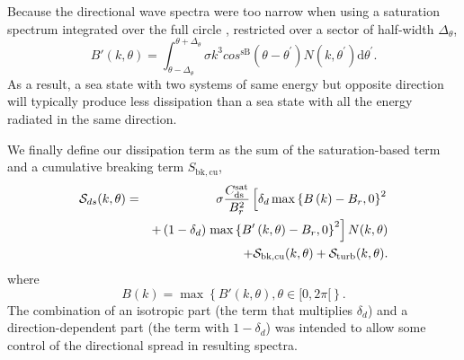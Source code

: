 Because the directional wave spectra were too narrow when using a
saturation spectrum integrated over the full circle \citep{art:AL06},
\citet{art:Aea10} restricted over a sector of half-width $\Delta_\theta$,
\begin{equation}
B'\left(k,\theta\right)=
\int_{\theta-\Delta_\theta}^{\theta+\Delta_\theta} \sigma k^3 cos^{\mathrm{sB}}\left(\theta-
\theta^{\prime}\right) N(k,\theta^{\prime}) \mathrm d
\theta^{\prime} \label{defBofkprime}.
\end{equation}
As a result, a sea state with two systems of same energy but opposite
direction will typically produce less dissipation than a sea state with all
the energy radiated in the same direction.

We finally define our dissipation term as the sum of the saturation-based term
and a cumulative breaking term $S_{\mathrm{bk,cu}}$,
\begin{eqnarray}
{\cal S}_{ds}(k,\theta)& =&  \sigma
 \frac{C_{\mathrm{ds}}^{\mathrm{sat}}}{B^2_r} \left[ \delta_d
\max\left\{  B\left(k\right) -
B_r,0\right\}^2 \right.
\nonumber \\
  & & +  \left(1-\delta_d \right) \left. \max\left\{B'\left(k,\theta \right)- B_r
 ,0\right\}^2\right]N(k,\theta)  \nonumber \\
 & & + {\cal S}_{\mathrm{bk,cu}}(k,\theta) + {\cal S}_{\mathrm{turb}}(k,\theta) \label{Sds_all}.
\end{eqnarray}
where
\begin{equation}
B\left(k \right)=\max\left\{B'(k,\theta), \theta \in [0,2
\pi[\right\} \label{defBof}.
\end{equation}
The combination of an isotropic part (the term that multiplies $ \delta_d$)
and a direction-dependent part (the term with $1-\delta_d$) was intended to
allow some control of the directional spread in resulting spectra.

